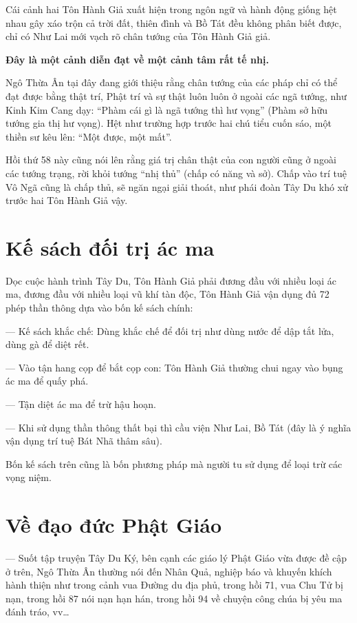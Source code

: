 Cái cảnh hai Tôn Hành Giả xuất hiện trong ngôn ngữ và hành động giống hệt nhau gây xáo trộn cả trời đất, thiên đình và Bồ Tát đều không phân biết được, chỉ có Như Lai mới vạch rõ chân tướng của Tôn Hành Giả giả.

{\bf Đây là một cảnh diễn đạt về một cảnh tâm rất tế nhị.}

Ngô Thừa Ân tại đây đang giới thiệu rằng chân tướng của các pháp chỉ có thể đạt được bằng thật trí, Phật trí và sự thật luôn luôn ở ngoài các ngã tướng, như Kinh Kim Cang dạy: ``Phàm cái gì là ngã tướng thì hư vọng'' (Phàm sở hữu tướng gia thị hư vọng). Hệt như trường hợp trước hai chú tiểu cuốn sáo, một thiền sư kêu lên: ``Một được, một mất''.

Hồi thứ 58 này cũng nói lên rằng giá trị chân thật của con người cũng ở ngoài các tướng trạng, rời khỏi tướng ``nhị thủ'' (chấp có năng và sở). Chấp vào trí tuệ Vô Ngã cũng là chấp thủ, sẽ ngăn ngại giải thoát, như phái đoàn Tây Du khó xử trước hai Tôn Hành Giả vậy.

\section{Kế sách đối trị ác ma} %
\label{sec:ke_sach_doi_tri_ac_ma}

Dọc cuộc hành trình Tây Du, Tôn Hành Giả phải đương đầu với nhiều loại ác ma, đương đầu với nhiều loại vũ khí tàn độc, Tôn Hành Giả vận dụng đủ 72 phép thần thông dựa vào bốn kế sách chính:

— Kế sách khắc chế: Dùng khắc chế để đối trị như dùng nước để dập tắt lửa, dùng gà để diệt rết.

— Vào tận hang cọp để bắt cọp con: Tôn Hành Giả thường chui ngay vào bụng ác ma để quấy phá.

— Tận diệt ác ma để trừ hậu hoạn.

— Khi sử dụng thần thông thất bại thì cầu viện Như Lai, Bồ Tát (đây là ý nghĩa vận dụng trí tuệ Bát Nhã thâm sâu).

Bốn kế sách trên cũng là bốn phương pháp mà người tu sử dụng để loại trừ các vọng niệm.

\section{Về đạo đức Phật Giáo} %
\label{sec:ve_dao_duc_Phat_Giao}

— Suốt tập truyện Tây Du Ký, bên cạnh các giáo lý Phật Giáo vừa được đề cập ở trên, Ngô Thừa Ân thường nói đến Nhân Quả, nghiệp báo và khuyến khích hành thiện như trong cảnh vua Đường du địa phủ, trong hồi 71, vua Chu Tử bị nạn, trong hồi 87 nói nạn hạn hán, trong hồi 94 về chuyện công chúa bị yêu ma đánh tráo, vv\ldots

